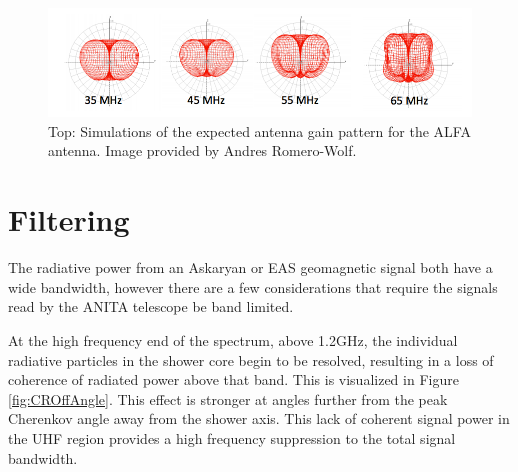 \begin{figure}
\centering
	\includegraphics[width=\textwidth]{figures/ALFA_gainPattern}
	\caption{Top: Simulations of the expected antenna gain  pattern for the ALFA antenna.  Image provided by Andres Romero-Wolf.}
	\label{fig:ALFA}
\end{figure}


\section{Filtering}
		The radiative power from an Askaryan or EAS geomagnetic signal both have a wide bandwidth, however there are a few considerations that require the signals read by the ANITA telescope be band limited.
		
		At the high frequency end of the spectrum, above 1.2GHz, the individual radiative particles in the shower core begin to be resolved, resulting in a loss of coherence of radiated power above that band.  This is visualized in Figure \ref{fig:CROffAngle}.  This effect is stronger at angles further from the peak Cherenkov angle away from the shower axis.\cite{PhysRevD.84.103003}  This lack of coherent signal power in the UHF region provides a high frequency suppression to the total signal bandwidth.


